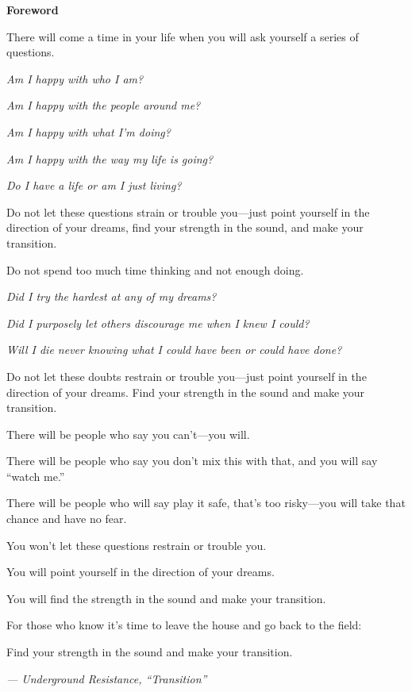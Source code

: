 \newpage
\thispagestyle{empty}

\vspace*{2cm}

\begin{center}
{\Large\bfseries Foreword}
\end{center}

\vspace{1.5cm}

There will come a time in your life when you will ask yourself a series of questions.

\textit{Am I happy with who I am?}

\textit{Am I happy with the people around me?}

\textit{Am I happy with what I'm doing?}

\textit{Am I happy with the way my life is going?}

\textit{Do I have a life or am I just living?}

Do not let these questions strain or trouble you---just point yourself in the direction of your dreams, find your strength in the sound, and make your transition.

\vspace{1cm}

Do not spend too much time thinking and not enough doing.

\textit{Did I try the hardest at any of my dreams?}

\textit{Did I purposely let others discourage me when I knew I could?}

\textit{Will I die never knowing what I could have been or could have done?}

Do not let these doubts restrain or trouble you---just point yourself in the direction of your dreams. Find your strength in the sound and make your transition.

\vspace{1cm}

There will be people who say you can't---you will.

There will be people who say you don't mix this with that, and you will say ``watch me.''

There will be people who will say play it safe, that's too risky---you will take that chance and have no fear.

You won't let these questions restrain or trouble you.

You will point yourself in the direction of your dreams.

You will find the strength in the sound and make your transition.

\vspace{1cm}

For those who know it's time to leave the house and go back to the field:

Find your strength in the sound and make your transition.

\vspace{1.5cm}

\begin{flushright}
\textit{--- Underground Resistance, ``Transition''}
\end{flushright}

\vspace*{\fill}

\newpage
